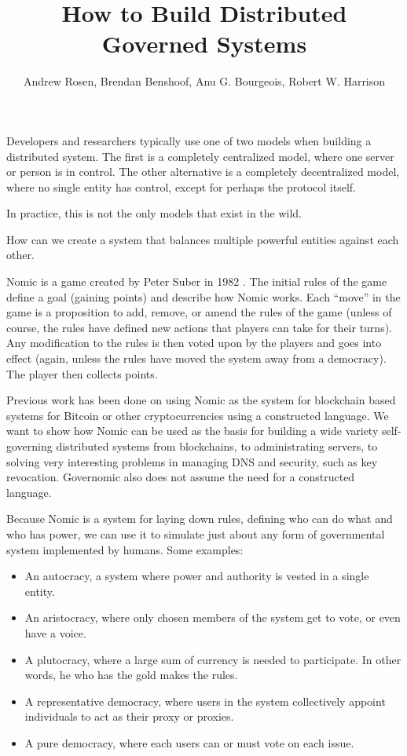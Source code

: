 \documentclass[11pt,letterpaper]{article}
\author{Andrew Rosen, Brendan Benshoof, Anu G. Bourgeois, Robert W. Harrison}
\date{}
\title{How to Build Distributed Governed Systems}
\begin{document}
	\maketitle
	
	
	Developers and researchers typically use one of two models when building a distributed system.
	The first is a completely centralized model, where one server or person is in control.
	The other alternative is a completely decentralized model, where no single entity has control, except for perhaps the protocol itself.
	
	In practice, this is not the only models that exist in the wild.  
	
	
	How can we create a system that balances multiple powerful entities against each other.
	
	
	
	Nomic is a game created by Peter Suber in 1982 \cite{nomic}.
	The initial rules of the game define a goal (gaining points) and describe how Nomic works.
	Each ``move'' in the game is a proposition to add, remove, or amend the rules of the game (unless of course, the rules have defined new actions that players can take for their turns).
	Any modification to the rules is then voted upon by the players and goes into effect (again, unless the rules have moved the system away from a democracy).
	The player then collects points.
	
	Previous work has been done on using Nomic as the system for blockchain based systems for Bitcoin or other cryptocurrencies \cite{tezos} using a constructed language.
	We want to show how Nomic can be used as the basis for building a wide variety self-governing distributed systems from blockchains, to administrating servers, to solving very interesting problems in managing DNS and security, such as key revocation.
	Governomic also does not assume the need for a constructed language.
	
	Because Nomic is a system for laying down rules, defining who can do what and who has power, we can use it to simulate just about any form of governmental system implemented by humans. 
	Some examples:
	\begin{itemize}
		\item An autocracy, a system where power and authority is vested in a single entity. 
		\item An aristocracy, where only chosen members of the system get to vote, or even have a voice.
		\item A plutocracy, where a large sum of currency is needed to participate. In other words, he who has the gold makes the rules.
		\item A representative democracy, where users in the system collectively appoint individuals to act as their proxy or proxies.
		\item A pure democracy, where each users can or must vote on each issue.
	\end{itemize}
	
\end{document}
